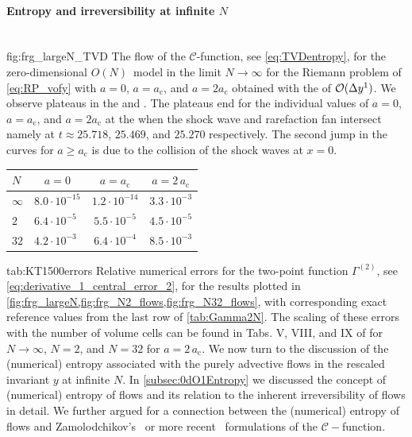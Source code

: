 \paragraph{Entropy and irreversibility at infinite \texorpdfstring{$N$}{N}}\label{paragraph:infiniteNflowsEntropy}\mbox{}\\%
	{fig:frg_largeN_TVD} %
	{%
		The \frg{} flow of the $\mathcal{C}$-function, see \cref{eq:TVDentropy}, for the zero-dimensional $O(N)$~model in the limit ${N \rightarrow \infty}$ for the Riemann problem of \cref{eq:RP_vofy} with $a = 0$, $a = a_\mathrm{c}$, and $a = 2 a_\mathrm{c}$ obtained with the \knpScheme{} of $\mathcal{O} ( \Delta y^1 )$.
		We observe plateaus in the \uv{} and \ir{}.
		The \ir{} plateaus end for the individual values of $a = 0$, $a = a_\mathrm{c}$, and $a = 2 a_\mathrm{c}$ at the \rgtimes{} when the shock wave and rarefaction fan intersect namely at $t \approx 25.718$, $25.469$, and $25.270$ respectively. The second jump in the curves for $a \geq a_\mathrm{c}$ is due to the collision of the shock waves at $x = 0$.
	} %
	{%
		\renewcommand{\arraystretch}{1.15}
		\small
		\begin{tabular}{l | c c c}
			\toprule
			$N$			&	$a = 0$		&	$a = a_\mathrm{c}$	&	$a = 2\, a_\mathrm{c}$\\
			\midrule
				$\infty$	&	$8.0 \cdot 10^{-15}$	&	$1.2 \cdot 10^{-14}$	&	$3.3 \cdot 10^{-3}$\\
				$2$		&	$6.4 \cdot 10^{-5\phantom{0}}$	&	$5.5 \cdot 10^{-5}$	&	$4.5 \cdot 10^{-5}$	\\
				$32$	&	$4.2 \cdot 10^{-3\phantom{0}}$	&	$6.4 \cdot 10^{-4}$	&	$8.5 \cdot 10^{-3}$\\
			\bottomrule
		\end{tabular}
	} %
	{tab:KT1500errors}%
	{%
		Relative numerical errors for the \ipi{} two-point function $\Gamma^{(2)}$, see \cref{eq:derivative_1_central_error_2}, for the results plotted in \cref{fig:frg_largeN,fig:frg_N2_flows,fig:frg_N32_flows},
		with corresponding exact reference values from the last row of \cref{tab:Gamma2N}.
		The scaling of these errors with the number of volume cells can be found in Tabs. V, VIII, and IX of  for $N\rightarrow\infty$, $N=2$, and $N=32$ for $a=2\,a_\mathrm{c}$.
	} %
We now turn to the discussion of the (numerical) entropy associated with the purely advective \frg{} flows in the rescaled invariant $y$ at infinite $N$.
In \cref{subsec:0dO1Entropy} we discussed the concept of (numerical) entropy of \frg{} flows and its relation to the inherent irreversibility of \grg{} flows in detail.
We further argued for a connection between the (numerical) entropy of \frg{} flows and Zamolodchikov's~\cite{Zamolodchikov:1986gt} or more recent~\cite{Codello:2013iqa,Codello:2015ana} formulations of the $\mathcal{C}-$function.

